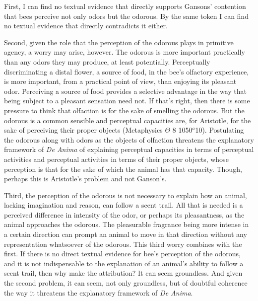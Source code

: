 \documentclass[12pt]{article}
\begin{document}
First, I can find no textual evidence that directly supports Gansons' contention that bees perceive not only odors but the odorous. By the same token I can find no textual evidence that directly contradicts it either. 

Second, given the role that the perception of the odorous plays in primitive agency, a worry may arise, however. The odorous is more important practically than any odors they may produce, at least potentially. Perceptually discriminating a distal flower, a source of food, in the bee's olfactory experience, is more important, from a practical point of view, than enjoying its pleasant odor. Perceiving a source of food provides a selective advantage in the way that being subject to a pleasant sensation need not. If that's right, then there is some pressure to think that olfaction is for the sake of smelling the odorous. But the odorous is a common sensible and perceptual capacities are, for Aristotle, for the sake of perceiving their proper objects (Metaphysics \( \Theta \) 8 1050\( ^{a} \)10). Postulating the odorous along with odors as the objects of olfaction threatens the explanatory framework of \emph{De Anima} of explaining perceptual capacities in terms of perceptual activities and perceptual activities in terms of their proper objects, whose perception is that for the sake of which the animal has that capacity. Though, perhaps this is Aristotle's problem and not Ganson's.

Third, the perception of the odorous is not necessary to explain how an animal, lacking imagination and reason, can follow a scent trail. All that is needed is a perceived difference in intensity of the odor, or perhaps its pleasantness, as the animal approaches the odorous. The pleasurable fragrance being more intense in a certain direction can prompt an animal to move in that direction without any representation whatsoever of the odorous. This third worry combines with the first. If there is no direct textual evidence for bee's perception of the odorous, and it is not indispensable to the explanation of an animal's ability to follow a scent trail, then why make the attribution? It can seem groundless. And given the second problem, it can seem, not only groundless, but of doubtful coherence the way it threatens the explanatory framework of \emph{De Anima}.
\end{document}
